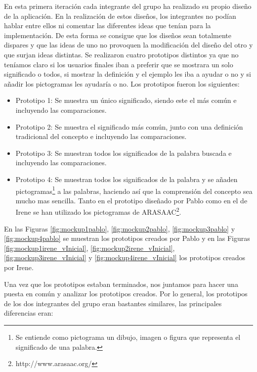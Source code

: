 En esta primera iteración cada integrante del grupo ha realizado su propio diseño de la aplicación. En la realización de estos diseños, los integrantes no podían hablar entre ellos ni comentar las diferentes ideas que tenían para la implementación. De esta forma se consigue que los diseños sean totalmente dispares y que las ideas de uno no provoquen la modificación del diseño del otro y que surjan ideas distintas.
Se realizaron cuatro prototipos distintos ya que no teníamos claro si los usuarios finales iban a preferir que se mostrara un solo significado o todos, si mostrar la definición y el ejemplo les iba a ayudar o no y si añadir los pictogramas les ayudaría o no.
Los prototipos fueron los siguientes:
\begin{itemize}
	\item Prototipo 1: Se muestra un único significado, siendo este el más común e incluyendo las comparaciones.
	\item Prototipo 2: Se muestra el significado más común, junto con una definición tradicional del concepto e incluyendo las comparaciones.
	\item Prototipo 3: Se muestran todos los significados de la palabra buscada e incluyendo las comparaciones.
	\item Prototipo 4: Se muestran todos los significados de la palabra y se añaden pictogramas\footnote{Se entiende como pictograma un dibujo, imagen o figura que representa el significado de una palabra.} a las palabras, haciendo así que la comprensión del concepto sea mucho mas sencilla. Tanto en el prototipo diseñado por Pablo como en el de Irene se han utilizado los pictogramas de ARASAAC\footnote{http://www.arasaac.org/}.
	
\end{itemize}

En las Figuras \ref{fig:mockup1pablo}, \ref{fig:mockup2pablo}, \ref{fig:mockup3pablo} y \ref{fig:mockup4pablo} se muestran los prototipos creados por Pablo y en las Figuras \ref{fig:mockup1irene_vInicial}, \ref{fig:mockup2irene_vInicial},  \ref{fig:mockup3irene_vInicial} y \ref{fig:mockup4irene_vInicial} los prototipos creados por Irene.


 
Una vez que los prototipos estaban terminados, nos juntamos para hacer una puesta en común y analizar los prototipos creados. 
Por lo general, los prototipos de los dos integrantes del grupo eran bastantes similares, las principales diferencias eran:

